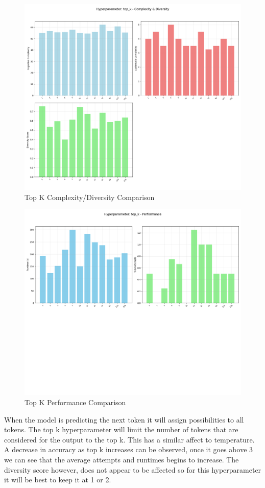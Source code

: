 \documentclass[12pt]{extarticle}
\begin{document}
\begin{figure}[H]
\centering
\includegraphics[width=0.65\linewidth]{Images/Hyperparam_top_k_Complexity.png}
\caption{Top K Complexity/Diversity Comparison}
\label{fig:Complexity_Comparison_Threads}
\end{figure}

\begin{figure}[H]
\centering
\includegraphics[width=0.65\linewidth]{Images/Hyperparam_top_k_Performance.png}
\caption{Top K Performance Comparison}
\label{fig:Complexity_Comparison_Threads}
\end{figure}

When the model is predicting the next token it will assign possibilities to all tokens. The top k hyperparameter will limit the number of tokens that are considered for the output to the top k. This has a similar affect to temperature. A decrease in accuracy as top k increases can be observed, once it goes above 3 we can see that the average attempts and runtimes begins to increase. The diversity score however, does not appear to be affected so for this hyperparameter it will be best to keep it at 1 or 2.
\end{document}
